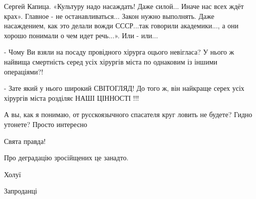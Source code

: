 \begin{itemize}
\obeycr
Сергей Капица.
«Культуру надо насаждать! Даже силой... Иначе нас всех ждёт крах».
Главное - не останавливаться...
Закон нужно выполнять.
Даже насаждением, как это делали вожди СССР...так говорили академики..., а они хорошо понимали о чем идет речь...».
Или - или...
\restorecr

 

- Чому Ви взяли на посаду провідного хірурга оцього невігласа? У нього ж
найвища смертність серед усіх хірургів міста по однаковим із іншими
операціями?!

- Зате який у нього широкий СВІТОГЛЯД! До того ж, він найкраще серех усіх
хірургів міста розділяє НАШІ ЦІННОСТІ !!!


 

А вы, как я понимаю, от русскоязычного спасателя круг ловить не будете? Гидно утонете? Просто интересно \Smiley[1.0][yellow]

 
Свята правда!

 
Про деградацію зросійщених це занадто.

 
Холуї

 
Запроданці

\end{itemize}

